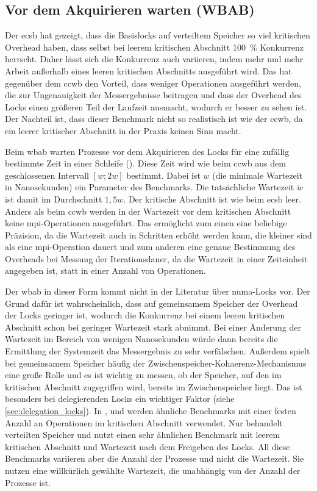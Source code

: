 \subsection{Vor dem Akquirieren warten (WBAB)}
\label{sec:wbab}

Der \gls{ecsb} hat gezeigt,
dass die Basislocks auf verteiltem Speicher so viel kritischen Overhead haben,
dass selbst bei leerem kritischen Abschnitt 100~\% \gls{Konkurrenz} herrscht.
Daher lässt sich die \gls{Konkurrenz} auch variieren,
indem mehr und mehr Arbeit außerhalb eines leeren kritischen Abschnitts ausgeführt wird.
Das hat gegenüber dem \gls{ccwb} den Vorteil,
dass weniger Operationen ausgeführt werden,
die zur Ungenauigkeit der Messergebnisse beitragen
und dass der Overhead des Locks einen größeren Teil der Laufzeit ausmacht,
wodurch er besser zu sehen ist.
Der Nachteil ist,
dass dieser Benchmark nicht so realistisch ist
wie der \gls{ccwb},
da ein leerer kritischer Abschnitt in der Praxis keinen Sinn macht.

Beim \gls{wbab} warten Prozesse
vor dem Akquirieren des Locks
für eine zufällig bestimmte Zeit
in einer Schleife
(\wbaburl).
Diese Zeit wird
wie beim \gls{ccwb}
aus dem geschlossenen Intervall $[w; 2w]$ bestimmt.
Dabei ist $w$
(die minimale Wartezeit in Nanosekunden)
ein Parameter des Benchmarks.
Die tatsächliche Wartezeit $\tilde{w}$ ist damit im Durchschnitt $1,5w$.
Der kritische Abschnitt ist wie beim \gls{ecsb} leer.
Anders als beim \gls{ccwb} werden in der Wartezeit vor dem kritischen Abschnitt
keine \gls{mpi}-Operationen ausgeführt.
Das ermöglicht zum einen eine beliebige Präzision,
da die Wartezeit auch in Schritten erhöht werden kann,
die kleiner sind
als eine \gls{mpi}-Operation dauert
und zum anderen eine genaue Bestimmung des Overheads bei Messung der Iterationsdauer,
da die Wartezeit in einer Zeiteinheit angegeben ist,
statt in einer Anzahl von Operationen.

Der \gls{wbab} in dieser Form kommt nicht in der Literatur über \gls{numa}-Locks vor.
Der Grund dafür ist wahrscheinlich,
dass auf gemeinsamem Speicher der Overhead der Locks geringer ist,
wodurch die \gls{Konkurrenz} bei einem leeren kritischen Abschnitt schon bei geringer Wartezeit stark abnimmt.
Bei einer Änderung der Wartezeit im Bereich von wenigen Nanosekunden
würde dann bereits die Ermittlung der Systemzeit das Messergebnis zu sehr verfälschen.
Außerdem spielt bei gemeinsamem Speicher häufig der \gls{Zwischenspeicher}-\gls{Kohaerenz}-Mechanismus eine große Rolle
und es ist wichtig zu messen,
ob der Speicher,
auf den im kritischen Abschnitt zugegriffen wird,
bereits im \gls{Zwischenspeicher} liegt.
Das ist besonders bei delegierenden Locks ein wichtiger Faktor
(siehe \autoref{sec:delegation_locks}).
In \cite{FC-MCS-Lock}, \cite{Cohort-Lock} und \cite{HMCS-Lock}
werden ähnliche Benchmarks mit einer festen Anzahl an Operationen
im kritischen Abschnitt verwendet.
Nur \cite{RMA-RW} behandelt verteilten Speicher
und nutzt einen sehr ähnlichen Benchmark mit leerem kritischen Abschnitt
und Wartezeit nach dem Freigeben des Locks.
All diese Benchmarks variieren aber die Anzahl der Prozesse und nicht die Wartezeit.
Sie nutzen eine willkürlich gewählte Wartezeit,
die unabhängig von der Anzahl der Prozesse ist.

